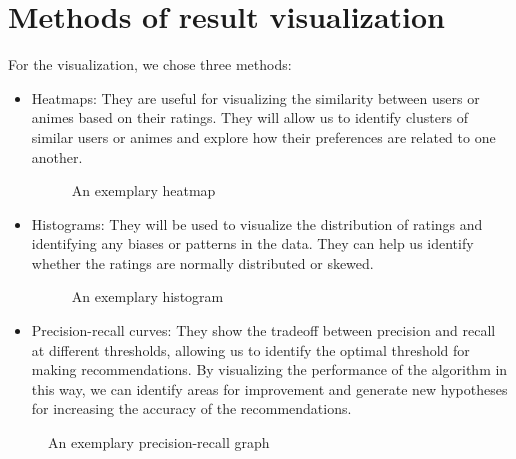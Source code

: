 \section{Methods of result visualization}

For the visualization, we chose three methods:
\begin{itemize}
\item Heatmaps: They are useful for visualizing the similarity between users or animes based on their ratings. They will allow us to identify clusters of similar users or animes and explore how their preferences are related to one another.

\begin{figure}
\centering
    \caption{An exemplary heatmap}
    \label{fig:heatmap}
\end{figure}

\item Histograms: They will be used to visualize the distribution of ratings and identifying any biases or patterns in the data. They can help us identify whether the ratings are normally distributed or skewed.

\begin{figure}
\centering
    \caption{An exemplary histogram}
    \label{fig:precission-recall}
\end{figure}

\item Precision-recall curves: They show the tradeoff between precision and recall at different thresholds, allowing us to identify the optimal threshold for making recommendations. By visualizing the performance of the algorithm in this way, we can identify areas for improvement and generate new hypotheses for increasing the accuracy of the recommendations.
\end{itemize}

\begin{figure}
\centering
    \caption{An exemplary precision-recall graph}
    \label{fig:histogram}
\end{figure}

